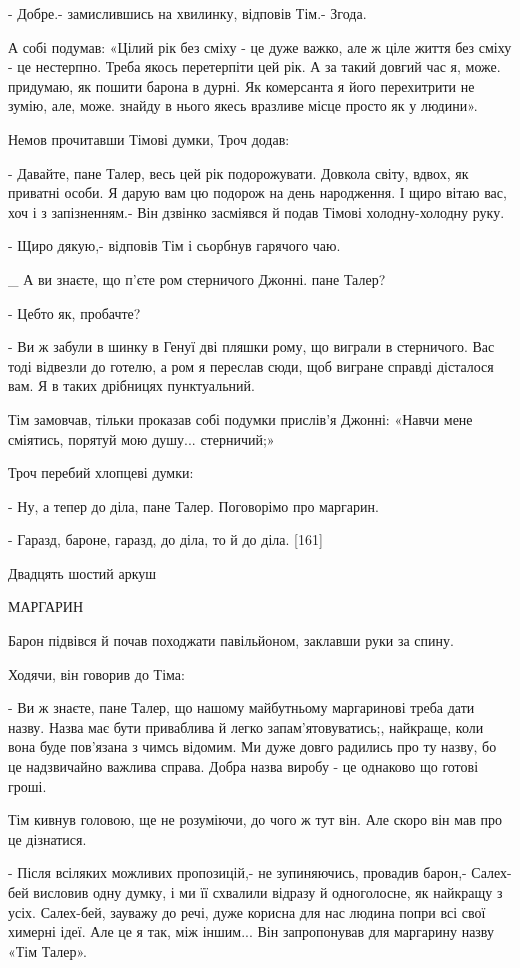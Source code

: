 - Добре.- замислившись на хвилинку, відповів Тім.- Згода.

А собі подумав: «Цілий рік без сміху - це дуже важко, але ж ціле життя без сміху - це нестерпно. Треба якось перетерпіти цей рік. А за такий довгий час я, може. придумаю, як пошити барона в дурні. Як комерсанта я його перехитрити не зумію, але, може. знайду в нього якесь вразливе місце просто як у людини».

Немов прочитавши Тімові думки, Троч додав:

- Давайте, пане Талер, весь цей рік подорожувати. Довкола світу, вдвох, як приватні особи. Я дарую вам цю подорож на день народження. І щиро вітаю вас, хоч і з запізненням.- Він дзвінко засміявся й подав Тімові холодну-холодну руку.

- Щиро дякую,- відповів Тім і сьорбнув гарячого чаю.

_ А ви знаєте, що п'єте ром стерничого Джонні. пане Талер?

- Цебто як, пробачте?

- Ви ж забули в шинку в Генуї дві пляшки рому, що виграли в стерничого. Вас тоді відвезли до готелю, а ром я переслав сюди, щоб вигране справді дісталося вам. Я в таких дрібницях пунктуальний.

Тім замовчав, тільки проказав собі подумки прислів'я Джонні: «Навчи мене сміятись, порятуй мою душу... стерничий;»

Троч перебий хлопцеві думки:

- Ну, а тепер до діла, пане Талер. Поговорімо про маргарин.

- Гаразд, бароне, гаразд, до діла, то й до діла. [161]

Двадцять шостий аркуш

МАРГАРИН

Барон підвівся й почав походжати павільйоном, заклавши руки за спину.

Ходячи, він говорив до Тіма:

- Ви ж знаєте, пане Талер, що нашому майбутньому маргаринові треба дати назву. Назва має бути приваблива й легко запам'ятовуватись;, найкраще, коли вона буде пов'язана з чимсь відомим. Ми дуже довго радились про ту назву, бо це надзвичайно важлива справа. Добра назва виробу - це однаково що готові гроші.

Тім кивнув головою, ще не розуміючи, до чого ж тут він. Але скоро він мав про це дізнатися.

- Після всіляких можливих пропозицій,- не зупиняючись, провадив барон,- Салех-бей висловив одну думку, і ми її схвалили відразу й одноголосне, як найкращу з усіх. Салех-бей, зауважу до речі, дуже корисна для нас людина попри всі свої химерні ідеї. Але це я так, між іншим... Він запропонував для маргарину назву «Тім Талер».

